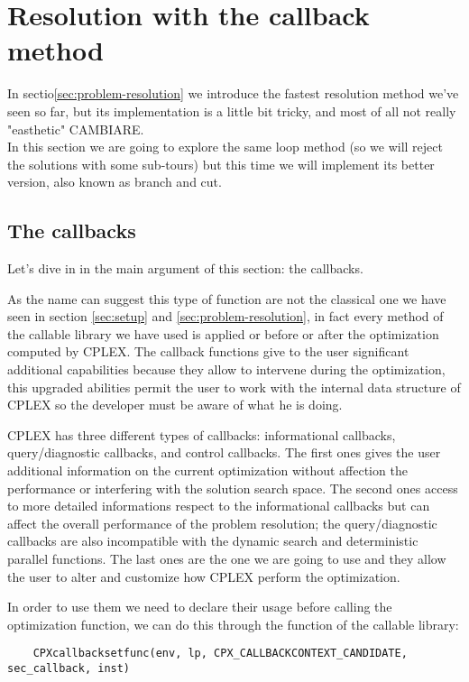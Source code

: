 \section{Resolution with the callback method}
In sectio\ref{sec:problem-resolution} we introduce the fastest resolution method we've seen so far, but its implementation is a little bit tricky, and most of all not really "easthetic" CAMBIARE.\\
In this section we are going to explore the same loop method (so we will reject the solutions with some sub-tours) but this time we will implement its better version, also known as branch and cut.

\subsection{The callbacks}
Let's dive in in the main argument of this section: the callbacks.

As the name can suggest this type of function are not the classical one we have seen in section \ref{sec:setup} and \ref{sec:problem-resolution}, in fact every method of the callable library we have used is applied or before or after the optimization computed by CPLEX. The callback functions give to the user significant additional capabilities because they allow to intervene during the optimization, this upgraded abilities permit the user to work with the internal data structure of CPLEX so the developer must be aware of what he is doing.

CPLEX has three different types of callbacks: informational callbacks, query/diagnostic callbacks, and control callbacks. The first ones gives the user additional information on the current optimization without affection the performance or interfering with the solution search space. The second ones access to more detailed informations respect to the informational callbacks but can affect the overall performance of the problem resolution; the query/diagnostic callbacks are also incompatible with the dynamic search and deterministic parallel functions. The last ones are the one we are going to use and they allow the user to alter and customize how CPLEX perform the optimization.

In order to use them we need to declare their usage before calling the optimization function, we can do this through the function of the callable library:

\begin{lstlisting}
	CPXcallbacksetfunc(env, lp, CPX_CALLBACKCONTEXT_CANDIDATE, sec_callback, inst)
\end{lstlisting}

